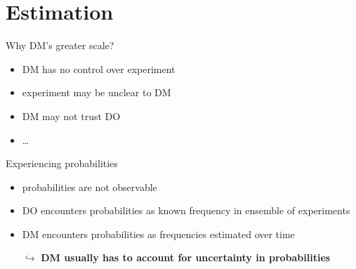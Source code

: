 \section{Estimation}
\begin{frame}{Why DM's greater scale?}

\begin{itemize}
  \item DM has no control over experiment
  \item experiment may be unclear to DM
  \item DM may not trust DO
  \item \ldots
\end{itemize}
\end{frame}

\begin{frame}{Experiencing probabilities}

\begin{itemize}
  \item probabilities are not observable
  \item DO encounters probabilities as known frequency in ensemble of experiments
  \item DM encounters probabilities as frequencies estimated over time

  \item[$\hookrightarrow$] \textbf{DM usually has to account for uncertainty in probabilities}
\end{itemize}
\end{frame}


